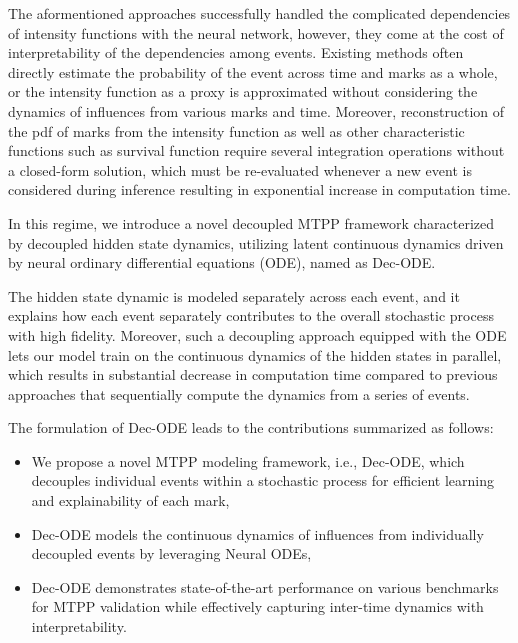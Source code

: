 The aformentioned approaches successfully handled the complicated dependencies of intensity functions with the neural network, however, they come at the cost of interpretability of the dependencies among events. 
Existing methods often directly estimate the probability of the event across time and marks as a whole, %
or the intensity function as a proxy is approximated without considering the dynamics of influences from various marks and time. 
Moreover, reconstruction of the pdf of marks from the intensity function as well as other characteristic functions 
such as survival function require several integration operations without a closed-form solution, 
which must be re-evaluated whenever a new event is considered during inference resulting in exponential increase in computation time.

In this regime, we introduce a novel decoupled MTPP framework characterized by decoupled hidden state dynamics, 
utilizing latent continuous dynamics driven by neural ordinary differential equations (ODE), named as Dec-ODE. 

The hidden state dynamic is modeled separately across each event, 
and it explains how each event separately contributes to the overall stochastic process with high fidelity. 
Moreover, such a decoupling approach equipped with the ODE lets our model train on the continuous dynamics of the hidden states in parallel, 
which results in substantial decrease in computation time compared to previous approaches 
that sequentially compute the dynamics from a series of events.

The formulation of Dec-ODE leads to the contributions summarized as follows:
\begin{itemize}
\item We propose a novel MTPP modeling framework, i.e., Dec-ODE, which decouples individual events within a stochastic process for efficient learning and explainability of each mark, 
\item Dec-ODE models the continuous dynamics of influences from individually decoupled events by leveraging Neural ODEs,
\item Dec-ODE demonstrates state-of-the-art performance on various benchmarks for MTPP validation while effectively capturing inter-time dynamics with interpretability. 
\end{itemize} 



